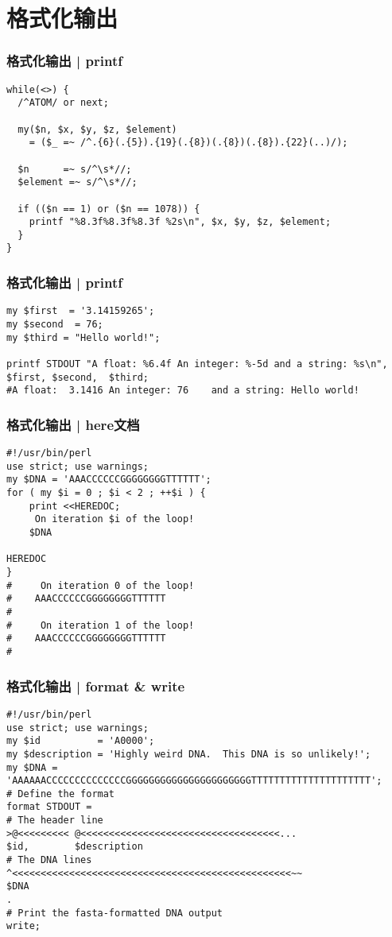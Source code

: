 \section{格式化输出}
\begin{frame}[fragile]
  \frametitle{格式化输出 | printf}
\begin{lstlisting}
while(<>) {
  /^ATOM/ or next;

  my($n, $x, $y, $z, $element)
    = ($_ =~ /^.{6}(.{5}).{19}(.{8})(.{8})(.{8}).{22}(..)/);

  $n      =~ s/^\s*//;
  $element =~ s/^\s*//;

  if (($n == 1) or ($n == 1078)) {
    printf "%8.3f%8.3f%8.3f %2s\n", $x, $y, $z, $element;
  }
}
\end{lstlisting}
\end{frame}

\begin{frame}[fragile]
  \frametitle{格式化输出 | printf}
\begin{lstlisting}
my $first  = '3.14159265';
my $second  = 76;
my $third = "Hello world!";

printf STDOUT "A float: %6.4f An integer: %-5d and a string: %s\n", $first, $second,  $third;
#A float:  3.1416 An integer: 76    and a string: Hello world!
\end{lstlisting}
\end{frame}

\begin{frame}[fragile]
  \frametitle{格式化输出 | here文档}
\begin{lstlisting}
#!/usr/bin/perl
use strict; use warnings;
my $DNA = 'AAACCCCCCGGGGGGGGTTTTTT';
for ( my $i = 0 ; $i < 2 ; ++$i ) {
    print <<HEREDOC;
     On iteration $i of the loop!
    $DNA

HEREDOC
}
#     On iteration 0 of the loop!
#    AAACCCCCCGGGGGGGGTTTTTT
#
#     On iteration 1 of the loop!
#    AAACCCCCCGGGGGGGGTTTTTT
#
\end{lstlisting}
\end{frame}

\begin{frame}[fragile]
  \frametitle{格式化输出 | format \& write}
\begin{lstlisting}[basicstyle=\footnotesize\tt,numberstyle=\scriptsize]
#!/usr/bin/perl
use strict; use warnings;
my $id          = 'A0000';
my $description = 'Highly weird DNA.  This DNA is so unlikely!';
my $DNA = 'AAAAAACCCCCCCCCCCCCCGGGGGGGGGGGGGGGGGGGGGGTTTTTTTTTTTTTTTTTTTTT';
# Define the format
format STDOUT =
# The header line
>@<<<<<<<<< @<<<<<<<<<<<<<<<<<<<<<<<<<<<<<<<<<<<...
$id,        $description
# The DNA lines
^<<<<<<<<<<<<<<<<<<<<<<<<<<<<<<<<<<<<<<<<<<<<<<<<<~~
$DNA
.
# Print the fasta-formatted DNA output
write;
\end{lstlisting}
\end{frame}

